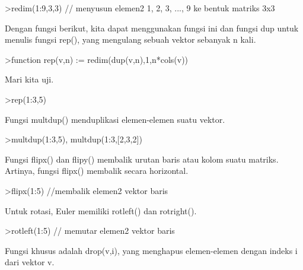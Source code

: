 \documentclass[a4paper,10pt]{article}
\begin{document}
\begin{eulernotebook}
\begin{euleroutput}
\end{euleroutput}
\begin{eulerprompt}
>redim(1:9,3,3) // menyusun elemen2 1, 2, 3, ..., 9 ke bentuk matriks 3x3
\end{eulerprompt}
\begin{euleroutput}
  
  Dengan fungsi berikut, kita dapat menggunakan fungsi ini dan fungsi dup untuk menulis fungsi rep(), yang mengulang sebuah vektor sebanyak n kali.
  
\end{euleroutput}
\begin{eulerprompt}
>function rep(v,n) := redim(dup(v,n),1,n*cols(v))
\end{eulerprompt}
\begin{euleroutput}
  
  Mari kita uji.
  
\end{euleroutput}
\begin{eulerprompt}
>rep(1:3,5)
\end{eulerprompt}
\begin{euleroutput}
  
  Fungsi multdup() menduplikasi elemen-elemen suatu vektor.
  
\end{euleroutput}
\begin{eulerprompt}
>multdup(1:3,5), multdup(1:3,[2,3,2])
\end{eulerprompt}
\begin{euleroutput}
  
  Fungsi flipx() dan flipy() membalik urutan baris atau kolom suatu matriks. Artinya, fungsi flipx() membalik secara horizontal.
  
\end{euleroutput}
\begin{eulerprompt}
>flipx(1:5) //membalik elemen2 vektor baris
\end{eulerprompt}
\begin{euleroutput}
  
  Untuk rotasi, Euler memiliki rotleft() dan rotright().
  
\end{euleroutput}
\begin{eulerprompt}
>rotleft(1:5) // memutar elemen2 vektor baris
\end{eulerprompt}
\begin{euleroutput}
  
  Fungsi khusus adalah drop(v,i), yang menghapus elemen-elemen dengan indeks i dari vektor v.
  

\end{euleroutput}
\end{eulernotebook}
\end{document}
